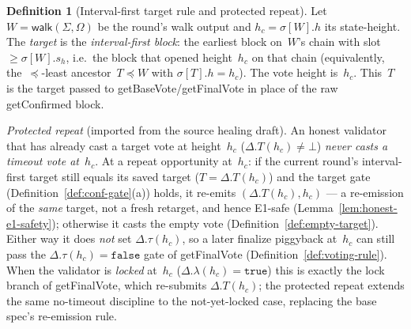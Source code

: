 \ifx\litemode\undefined\documentclass{article}\fi
\newcommand{\getBaseVote}{\textsf{getBaseVote}\xspace}
\newcommand{\getFinalVote}{\textsf{getFinalVote}\xspace}
\newcommand{\getConfirmed}{\textsf{getConfirmed}\xspace}
\newcommand{\walk}{\textsf{walk}\xspace}
\theoremstyle{plain}
\theoremstyle{definition}
\newtheorem{definition}{Definition}
\theoremstyle{remark}
\begin{document}
\begin{definition}[Interval-first target rule and protected repeat]\label{def:target-rule}
Let $W = \walk(\Sigma, \Omega)$ be the round's walk output and
$h_c = \sigma[W].h$ its state-height.  The \emph{target} is the
\emph{interval-first block}: the earliest block on~$W$'s chain with slot
$\geq \sigma[W].s_h$, i.e.\ the block that opened height~$h_c$ on that
chain (equivalently, the~$\preceq$-least ancestor~$T \preceq W$ with
$\sigma[T].h = h_c$).  The vote height is~$h_c$.  This~$T$ is the target
passed to \getBaseVote/\getFinalVote{} in place of the raw \getConfirmed{}
block.

\emph{Protected repeat} (imported from the source healing draft).  An honest
validator that has already cast a target vote at height~$h_c$
($\Delta.T(h_c) \neq \bot$) \emph{never casts a timeout vote at~$h_c$}.  At a
repeat opportunity at~$h_c$: if the current round's interval-first target still
equals its saved target ($T = \Delta.T(h_c)$) and the target gate
(Definition~\ref{def:conf-gate}(a)) holds, it re-emits $(\Delta.T(h_c), h_c)$
--- a re-emission of the \emph{same} target, not a fresh retarget, and hence
E1-safe (Lemma~\ref{lem:honest-e1-safety}); otherwise it casts the empty vote
(Definition~\ref{def:empty-target}).  Either way it does \emph{not} set
$\Delta.\tau(h_c)$, so a later finalize piggyback at~$h_c$ can still pass the
$\Delta.\tau(h_c) = \mathtt{false}$ gate of \getFinalVote{}
(Definition~\ref{def:voting-rule}).  When the validator is \emph{locked}
at~$h_c$ ($\Delta.\lambda(h_c) = \mathtt{true}$) this is exactly the lock branch
of \getFinalVote{}, which re-submits $\Delta.T(h_c)$; the protected repeat
extends the same no-timeout discipline to the not-yet-locked case, replacing
the base spec's re-emission rule.
\end{definition}
\end{document}
